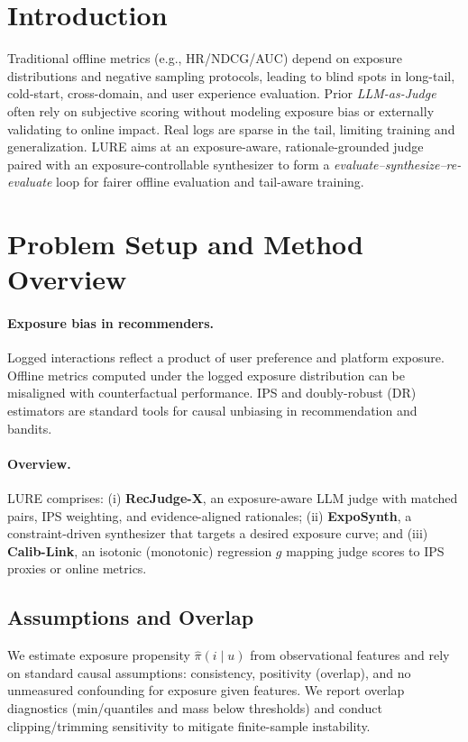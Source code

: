 \documentclass[sigconf,anonymous,review]{acmart}
\begin{document}

\maketitle

\section{Introduction}
Traditional offline metrics (e.g., HR/NDCG/AUC) depend on exposure distributions and negative sampling protocols, leading to blind spots in long-tail, cold-start, cross-domain, and user experience evaluation. Prior \emph{LLM-as-Judge} often rely on subjective scoring without modeling exposure bias or externally validating to online impact. Real logs are sparse in the tail, limiting training and generalization. LURE aims at an exposure-aware, rationale-grounded judge paired with an exposure-controllable synthesizer to form a \emph{evaluate–synthesize–re-evaluate} loop for fairer offline evaluation and tail-aware training.

\section{Problem Setup and Method Overview}
\paragraph{Exposure bias in recommenders.} Logged interactions reflect a product of user preference and platform exposure. Offline metrics computed under the logged exposure distribution can be misaligned with counterfactual performance. IPS and doubly-robust (DR) estimators are standard tools for causal unbiasing in recommendation and bandits.

\paragraph{Overview.} LURE comprises: (i) \textbf{RecJudge-X}, an exposure-aware LLM judge with matched pairs, IPS weighting, and evidence-aligned rationales; (ii) \textbf{ExpoSynth}, a constraint-driven synthesizer that targets a desired exposure curve; and (iii) \textbf{Calib-Link}, an isotonic (monotonic) regression \(g\) mapping judge scores to IPS proxies or online metrics.

\subsection*{Assumptions and Overlap}
We estimate exposure propensity \(\hat{\pi}(i\mid u)\) from observational features and rely on standard causal assumptions: consistency, positivity (overlap), and no unmeasured confounding for exposure given features. We report overlap diagnostics (min/quantiles and mass below thresholds) and conduct clipping/trimming sensitivity to mitigate finite-sample instability.
\end{document}
